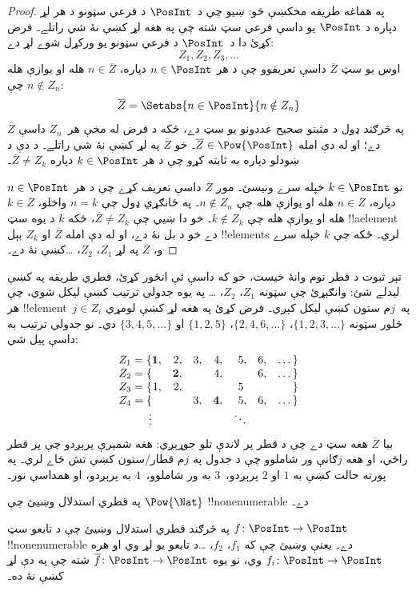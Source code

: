 \documentclass[../../../include/open-logic-section]{subfiles}
\begin{document}
\begin{proof}
په هماغه طريقه مخکښې ځو: ښيو چې د~$\PosInt$ د فرعي سټونو د هر
لړ دپاره د $\PosInt$ يو داسې فرعي سټ شته چې په هغه لړ کښې نۀ
شي راتلے۔ فرض کړئ دا د~$\PosInt$ د فرعي سټونو يو ورکړل شوے لړ دے:
\[
Z_{1}, Z_{2}, Z_{3}, \dots
\]
اوس يو سټ $\overline{Z}$ داسې تعريفوو چې د هر $n \in \PosInt$
دپاره، $n \in \overline{Z}$ هله او يوازې هله چې $n \notin Z_{n}$:
\[
\overline{Z} = \Setabs{n \in \PosInt}{n \notin Z_n}
\]
$\overline{Z}$ په څرګند ډول د مثبتو صحيح عددونو يو سټ دے، ځکه
د فرض له مخې هر~$Z_n$ داسې دے؛ او له دې امله
$\overline{Z} \in \Pow{\PosInt}$۔ خو $\overline{Z}$ په لړ کښې نۀ
شي راتلے۔ د دې د ښودلو دپاره به ثابته کړو چې د هر
$k \in \PosInt$ دپاره $\overline{Z} \neq Z_k$۔

نو $k \in \PosInt$ خپله سرے ونيسئ۔ موږ $\overline{Z}$ داسې تعريف
کړے چې د هر $n \in \PosInt$ دپاره، $n \in \overline{Z}$ هله او
يوازې هله چې $n \notin Z_n$۔ په ځانګړي ډول چې $n=k$ واخلو،
$k \in \overline{Z}$ هله او يوازې هله چې $k \notin Z_k$۔ خو دا
ښيي چې $\overline{Z} \neq Z_k$، ځکه $k$ د يوه سټ !!a{element}
دے خو د بل نۀ دے، او له دې امله $\overline{Z}$ او $Z_k$ بېل
!!{element}s لري۔ ځکه چې $k$ خپله سرے و، $\overline{Z}$ په لړ
$Z_1$، $Z_2$، \dots کښې نۀ دے۔
\end{proof}

\begin{explain}
تېر ثبوت د قطر نوم وانۀ خيست، خو که داسې ئې انځور کړئ، قطري
طريقه په کښې ليدلے شئ: وانګېړئ چې سټونه $Z_1$، $Z_2$، \dots
په يوه جدولي ترتيب کښې ليکل شوي، چې هر !!{element}~$j \in Z_i$
په~$j$م ستون کښې ليکل کېږي۔ فرض کړئ په هغه لړ کښې لومړي څلور
سټونه $\{1,2,3,\dots\}$، $\{2, 4, 6, \dots\}$، $\{1,2,5\}$ او
$\{3,4,5,\dots\}$ دي۔ نو جدولي ترتيب به داسې پيل شي:
\[
\begin{array}{r@{}rrrrrrr}
  Z_1 = \{ & \mathbf{1}, & 2, & 3, & 4, & 5, & 6, & \dots\}\\
  Z_2 = \{ &  & \mathbf{2}, &  & 4, &  & 6, & \dots\}\\
  Z_3 = \{ & 1, & 2, &  &  & 5\phantom{,} &  & \}\\
  Z_4 = \{ &  &  & 3, & \mathbf{4}, & 5, & 6, & \dots\}\\
  \vdots & & & & & \ddots
\end{array}
\]
بيا $\overline{Z}$ هغه سټ دے چې د قطر پر لاندې تلو جوړېږي: هغه
شمېرې پرېږدو چې پر قطر راځي، او هغه $j$ګانې ور شاملوو چې د جدول
په $j$م قطار/ستون کښې تش ځاے لري۔ په پورته حالت کښې به $1$ او
$2$ پرېږدو،~$3$ به ور شاملوو،~$4$ به پرېږدو، او همداسې نور۔
\end{explain}

\begin{prob}
په قطري استدلال وښيئ چې $\Pow{\Nat}$ !!{nonenumerable} دے۔
\end{prob}

\begin{prob}\label{sfr:siz:nen:prob:f-posint}
په څرګند قطري استدلال وښيئ چې د تابعو سټ
$f \colon \PosInt \to \PosInt$ !!{nonenumerable} دے۔ يعنې وښيئ
چې که $f_1$، $f_2$، \dots د تابعو يو لړ وي او هره
$f_i\colon \PosInt \to \PosInt$ وي، نو يوه
$\overline{f}\colon \PosInt \to \PosInt$ شته چې په دې لړ کښې نۀ ده۔
\end{prob}
\end{document}
